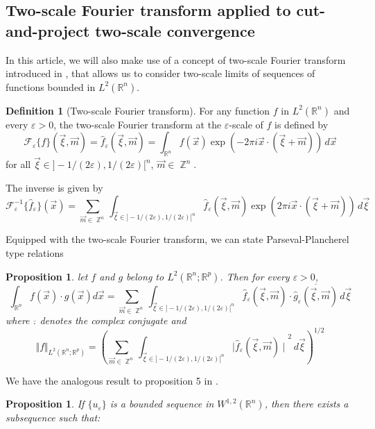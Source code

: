 \documentclass[a4paper,reqno]{amsart}
\numberwithin{equation}{section}
\numberwithin{equation}{section}		%
\numberwithin{figure}{section}			%
\numberwithin{table}{section}				%
\newcommand{\R}{\mathbb{R}}
\newtheorem{proposition}[theorem]{Proposition}
\theoremstyle{definition}
\newtheorem{definition}[theorem]{Definition}
\DeclareMathOperator{\Z}{\mathbb{Z}}
\renewcommand{\hat}{\widehat}
\newcommand{\<}{\ensuremath \leq}
\renewcommand{\>}{\ensuremath \geq}
\renewcommand{\hat}{\widehat}
\begin{document}
\subsection{Two-scale Fourier transform applied to cut-and-project two-scale convergence}
In this article, we will also make use of a concept of two-scale Fourier transform introduced in \cite{wellander2009}, that allows us to consider two-scale limits of sequences of functions bounded in $L^2(\R^n)$. 
\begin{definition}[Two-scale Fourier transform]
For any function $f$ in $L^2(\R^n)$ and every $\varepsilon>0$, the two-scale Fourier transform at the $\varepsilon$-scale of $f$ is defined by
\begin{equation}
\mathcal{F}_\varepsilon\{f\}(\vec{\xi},\vec{m})=\hat{f}_\varepsilon(\vec{\xi},\vec{m})=\int_{\R^n}f(\vec{x})\exp{(-2\pi i \vec{x}\cdot(\vec{\xi}+\vec{m}))} \, d\vec{x}
\end{equation}
for all $\vec{\xi}\in ]-1/(2\varepsilon),1/(2\varepsilon)[^n$, $\vec{m}\in\Z^n$.

The inverse is given by
\begin{equation}
\mathcal{F}^{-1}_\varepsilon\{\hat{f}_\varepsilon\}(\vec{x})=\sum_{\vec{m}\in\Z^n}\int_{\vec{\xi}\in ]-1/(2\varepsilon),1/(2\varepsilon)[^n}\hat{f}_\varepsilon(\vec{\xi},\vec{m})\exp{(2\pi i \vec{x}\cdot(\vec{\xi}+\vec{m}))} \, d\vec{\xi}
\end{equation}

Equipped with the two-scale Fourier transform, we can state Parseval-Plancherel type relations
\cite{wellander2009}
\begin{proposition}
    let $f$ and $g$ belong to $L^2(\R^n;\R^p)$. Then for every $\varepsilon>0$,
\begin{equation}
\int_{\R^n} f(\vec{x})\cdot g(\vec{x}) d\vec{x}=\sum_{\vec{m}\in\Z^n}\int_{\vec{\xi}\in ]-1/(2\varepsilon),1/(2\varepsilon)[^n}\hat{f}_\varepsilon(\vec{\xi},\vec{m})\cdot\overline{\hat{g}_\varepsilon(\vec{\xi},\vec{m})}\, d\vec{\xi}
\end{equation}
where $\overline{.}$ denotes the complex conjugate and
\begin{equation}
{\Vert f \Vert}_{L^2(\R^n;\R^p)}={\left(\sum_{\vec{m}\in\Z^n}\int_{\vec{\xi}\in ]-1/(2\varepsilon),1/(2\varepsilon)[^n}{\mid\hat{f}_\varepsilon(\vec{\xi},\vec{m})\mid}^{2}\, d\vec{\xi}\right)}^{1/2}
\end{equation}
\end{proposition}
We have the analogous result to proposition 5 in \cite{wellander2009}.
\begin{proposition}
    If $\{u_\varepsilon\}$ is a bounded sequence in $W^{1,2}(\R^n)$, then there exists a subsequence such that:


\end{proposition}
\end{definition}
\end{document}
